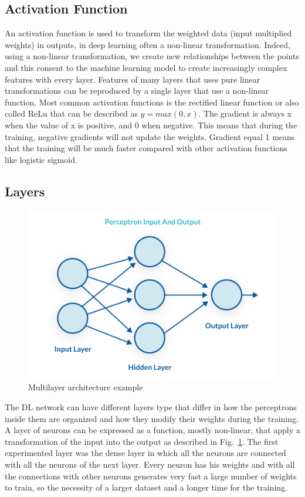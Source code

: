 \documentclass[12pt]{report}
\begin{document}
\subsection{Activation Function}

An activation function is used to transform the weighted data (input multiplied weights) 
in outputs, in deep learning often a non-linear transformation.
Indeed, using a non-linear transformation, we create new relationships between the points
and this consent to the machine learning model to create increasingly complex features with every layer.
Features of many layers that uses pure linear transformations can be reproduced by a single 
layer that use a non-linear function. 
Most common activation functions is the rectified linear function or also colled ReLu that
can be described as $y = max(0, x)$. The gradient is always x when the value of x is positive, 
and 0 when negative. This means that during the training, negative gradients will not update the weights.
Gradient equal 1 means that the training will be much faster compared with other activation functions
like logistic sigmoid.

\subsection{Layers}

\begin{figure}[t]
    \centering
    \includegraphics[scale=.5]{multilayer-perceptron.png}
    \caption{Multilayer architecture example \cite{percepimage}}
    \label{fig:multilayer}
\end{figure}

The DL network can have different layers type that differ in how the perceptrons inside them are organized and 
how they modify their weights during the training. 
A layer of neurons can be expressed as a function, mostly non-linear, that apply a transformation of the input into the output as described in Fig.~\ref{fig:multilayer}.
The first experimented layer was the dense layer in which all the neurons are connected
with all the neurons of the next layer. Every neuron has his weights
and with all the connections with other neurons generates very fast a large number of weights to train, so the necessity of a larger
dataset and a longer time for the training. 
\end{document}
